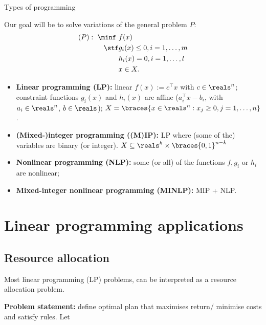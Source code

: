 \begin{frame}{Types of programming}

Our goal will be to solve variations of the general problem $P$:
%
\begin{align*}
	(P) :~ \minf \ & f(x) \\
	\stf & g_i(x) \leq 0, i = 1, \dots, m\\
	& h_i(x) = 0, i = 1, \dots, l \\
	& x \in X.
\end{align*}
%

\begin{itemize}
	\item {\bf Linear programming (LP):} \alert{linear} $f(x) := c^\top x$ with $c \in \reals^n$; constraint functions $g_i(x)$ and $h_i(x)$ are \alert{affine} ($a_i^\top x - b_i$, with $a_i \in \reals^n$, $b \in \reals$); $X = \braces{ x \in \reals^n : x_j \geq 0, j =1,\dots,n}$.  
	\item {\bf (Mixed-)integer programming ((M)IP):} LP where (some of the) variables are \alert{binary (or integer)}. $X \subseteq \reals^k \times \braces{0,1}^{n-k}$ 
	\item {\bf Nonlinear programming (NLP):} some (or all) of the functions $f, g_i$ or $h_i$ are \alert{nonlinear};
	\item {\bf Mixed-integer\hspace{-1pt} nonlinear\hspace{-2pt} programming\hspace{-2pt} (MINLP):}\hspace{-1pt} {\small MIP\hspace{-3pt} +\hspace{-3pt} NLP.} 
\end{itemize}


\section{Linear programming applications}

\subsection{Resource allocation}


Most linear programming (LP) problems, can be interpreted as a \alert{resource allocation} problem. 


{\bf Problem statement:} define \alert{optimal plan} that maximises return/ minimise costs and \alert{satisfy rules}. Let


\end{frame}
